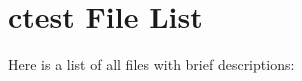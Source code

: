 \section{ctest File List}
Here is a list of all files with brief descriptions:\begin{CompactList}
\item{}
\end{CompactList}
